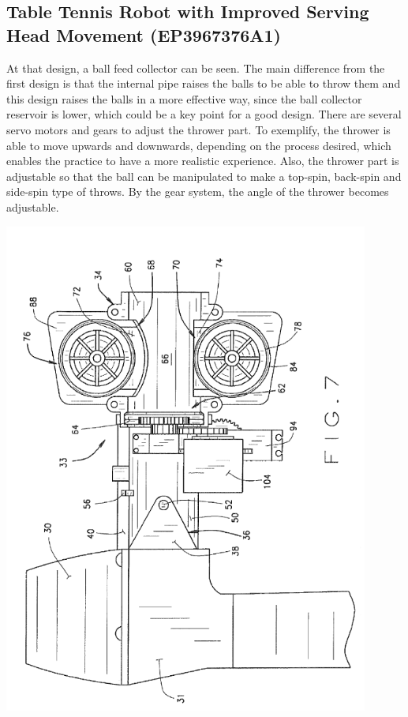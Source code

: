\documentclass[12pt]{article}
\begin{document}
\subsection{ Table Tennis Robot with Improved Serving Head Movement
 (EP3967376A1) \cite{Thoman2022}}

\begin{minipage}{0.7\textwidth}  %
     At that design, a ball feed collector can be seen. The main difference from the first design is that the internal pipe raises the balls to be able to throw them and this design raises the balls in a more effective way, since the ball collector reservoir is lower, which could be a key point for a good design. There are several servo motors and gears to adjust the thrower part. To exemplify, the thrower is able to move upwards and downwards, depending on the process desired, which enables the practice to have a more realistic experience. Also, the thrower part is adjustable so that the ball can be manipulated to make a top-spin, back-spin and side-spin type of throws. By the gear system, the angle of the thrower becomes adjustable. 
\end{minipage}%
\hfill
\begin{minipage}{0.28\textwidth}  %
    \centering
    \includegraphics[width=0.9\textwidth]{figures/patent3-3.png}
    \label{fig:pt3-1}
\end{minipage}
\end{document}
